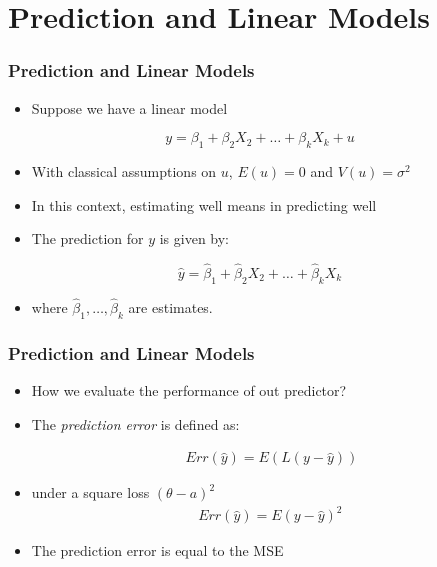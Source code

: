\documentclass[
  shownotes,
  xcolor={svgnames},
  hyperref={colorlinks,citecolor=DarkBlue,linkcolor=DarkRed,urlcolor=DarkBlue}
  , aspectratio=169]{beamer}
\begin{document}
\section{Prediction and Linear Models}
\begin{frame}
\frametitle{Prediction and Linear Models}

\begin{itemize}
  \item Suppose we have a linear model
\end{itemize}
\bigskip
\begin{equation}\label{eq:3_1_7}
y = \beta_1 +\beta_2 X_2 +\dots+\beta_k X_k +u
\end{equation}

\bigskip
\begin{itemize}
  \item With classical assumptions on $u$, $E(u)=0$ and $V(u) = \sigma^2$
  \item In this context, estimating well means in predicting well 
  \item The prediction for $y$ is given by:
\end{itemize}

\begin{equation}\label{eq:3_1_8}
\hat{y} = \hat{\beta}_1 + \hat{\beta}_2 X_2 + \dots + \hat{\beta}_k X_k
\end{equation}

\bigskip
\begin{itemize}
  \item where $\hat{\beta}_1,\dots,\hat{\beta}_k$ are estimates. 
\end{itemize}


\end{frame}
\begin{frame}
\frametitle{Prediction and Linear Models}

\begin{itemize}
  \item How we evaluate the performance of out predictor?
  \medskip
  \item The \emph{prediction error} is defined as:


  
  \begin{align}
    Err(\hat y) = E\left(L(y-\hat y)\right)
  \end{align}

  \item under a square loss $(\theta-a)^2$
  \begin{align}
    Err(\hat y) = E\left(y-\hat y\right)^2\
  \end{align}

\medskip
  \item The prediction error is equal to the MSE
  
  
\end{itemize}
\end{frame}
\end{document}
